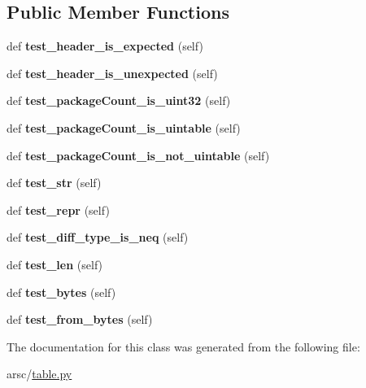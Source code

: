 \subsection*{Public Member Functions}
\begin{DoxyCompactItemize}
\item 
\mbox{\label{classtable_1_1ResTable__headerTests_acaaf1376b7e03122a48e3c484fd4b9a9}} 
def {\bfseries test\+\_\+header\+\_\+is\+\_\+expected} (self)
\item 
\mbox{\label{classtable_1_1ResTable__headerTests_adcf321b61dd159294ec464358e301d74}} 
def {\bfseries test\+\_\+header\+\_\+is\+\_\+unexpected} (self)
\item 
\mbox{\label{classtable_1_1ResTable__headerTests_a5ee577f424ee4c3a612e80b57db7b12f}} 
def {\bfseries test\+\_\+package\+Count\+\_\+is\+\_\+uint32} (self)
\item 
\mbox{\label{classtable_1_1ResTable__headerTests_a7cec9fb9979dbcdd1f2b086b94b9c416}} 
def {\bfseries test\+\_\+package\+Count\+\_\+is\+\_\+uintable} (self)
\item 
\mbox{\label{classtable_1_1ResTable__headerTests_afd6f8fcfcd36ef1db220abff6fadb8e4}} 
def {\bfseries test\+\_\+package\+Count\+\_\+is\+\_\+not\+\_\+uintable} (self)
\item 
\mbox{\label{classtable_1_1ResTable__headerTests_a6c486a7885aeaf4aea4ca531f489636b}} 
def {\bfseries test\+\_\+str} (self)
\item 
\mbox{\label{classtable_1_1ResTable__headerTests_a8ab266c99bf88bdc855544160ebedb53}} 
def {\bfseries test\+\_\+repr} (self)
\item 
\mbox{\label{classtable_1_1ResTable__headerTests_a83fa4a78ed1e49317478021fb1087061}} 
def {\bfseries test\+\_\+diff\+\_\+type\+\_\+is\+\_\+neq} (self)
\item 
\mbox{\label{classtable_1_1ResTable__headerTests_add1dd405f4e6869eef3ad6583e7ed1c2}} 
def {\bfseries test\+\_\+len} (self)
\item 
\mbox{\label{classtable_1_1ResTable__headerTests_a3335dee4721e5be777d1b0e4bfe2a42d}} 
def {\bfseries test\+\_\+bytes} (self)
\item 
\mbox{\label{classtable_1_1ResTable__headerTests_aa33e587c94f728b88acca0a3c1996f19}} 
def {\bfseries test\+\_\+from\+\_\+bytes} (self)
\end{DoxyCompactItemize}


The documentation for this class was generated from the following file\+:\begin{DoxyCompactItemize}
\item 
arsc/\mbox{\hyperlink{table_8py}{table.\+py}}\end{DoxyCompactItemize}
